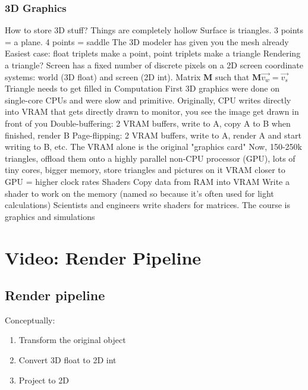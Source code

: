 \subsubsection{3D Graphics}

\begin{outline}
    \1 How to store 3D stuff?
        \2 Things are completely hollow
        \2 Surface is triangles. 3 points = a plane. 4 points = saddle
        \2 The 3D modeler has given you the mesh already
        \2 Easiest case: float triplets make a point, point triplets make a triangle
    \1 Rendering a triangle?
        \2 Screen has a fixed number of discrete pixels on a 2D screen
         coordinate systems: world (3D float) and screen (2D int). 
        Matrix $\mathbf{M}$ such that $\mathbf{M}\vec{v_w} = \vec{v_s}$
        \2 Triangle needs to get filled in
    \1 Computation
        \2 First 3D graphics were done on single-core CPUs and were slow and primitive. 
        \2 Originally, CPU writes directly into VRAM that gets directly drawn to monitor, you see the image get drawn in front of you
        \2 Double-buffering: 2 VRAM buffers, write to A, copy A to B when finished, render B
        \2 Page-flipping: 2 VRAM buffers, write to A, render A and start writing to B, etc.
        \2 The VRAM alone is the original "graphics card"
        \2 Now, 150-250k triangles, offload them onto a highly parallel non-CPU processor (GPU), lots of tiny cores, bigger memory, store triangles and pictures on it
        \2 VRAM closer to GPU = higher clock rates
    \1 Shaders 
        \2 Copy data from RAM into VRAM
        \2 Write a shader to work on the memory (named so because it's often used for light calculations)
        \2 Scientists and engineers write shaders for matrices. The course is graphics and simulations

\end{outline}

\section{Video: Render Pipeline}

\subsection{Render pipeline}

Conceptually:

\begin{enumerate}
    \item Transform the original object
    \item Convert 3D float to 2D int
    \item Project to 2D
\end{enumerate}

